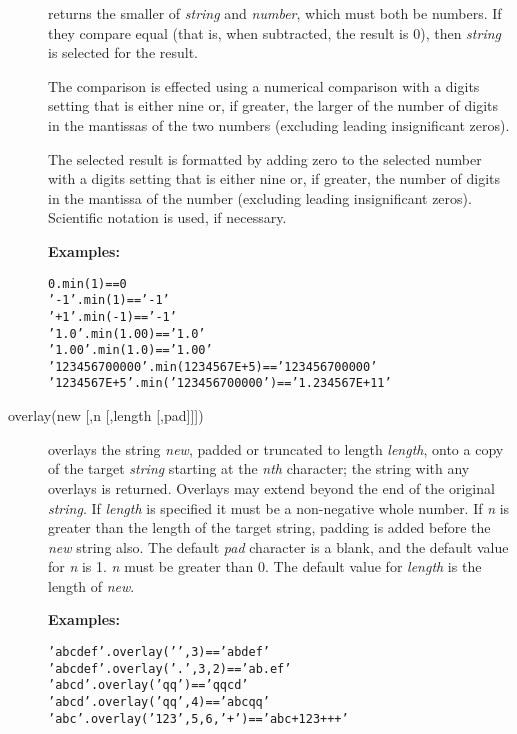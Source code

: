\begin{description}
returns the smaller of \emph{string} and \emph{number}, which
must both be numbers.  If they compare equal (that is, when subtracted,
the result is 0), then \emph{string} is selected for the result.
 
The comparison is effected using a numerical comparison with a digits
setting that is either nine or, if greater, the larger of the number of
digits in the mantissas of the two numbers (excluding leading
insignificant zeros).
 
The selected result is formatted by adding zero to the selected number
with a digits setting that is either nine or, if greater, the number of
digits in the mantissa of the number (excluding leading insignificant
zeros).
Scientific notation is used, if necessary.
 
\textbf{Examples:}
\begin{alltt}
0.min(1)          ==0
'-1'.min(1)       =='-1'
'+1'.min(-1)      =='-1'
'1.0'.min(1.00)   =='1.0'
'1.00'.min(1.0)   =='1.00'
'123456700000'.min(1234567E+5)   == '123456700000'
'1234567E+5'.min('123456700000') == '1.234567E+11'
\end{alltt}

\item[overlay(new [,n [,length [,pad{]]]})]\label{refoverlay}
overlays the string \emph{new}, padded or truncated to length
\emph{length}, onto a copy of the target \emph{string} starting
at the \emph{n}\emph{th} character; the string with any overlays is
returned.  Overlays may extend beyond the end of the original
\emph{string}.
If \emph{length} is specified it must be a non-negative whole
number.
If \emph{n} is greater than the length of
the target string, padding is added before the \emph{new} string
also.
The default \emph{pad} character is a blank, and the default value
for \emph{n} is 1.
\emph{n} must be greater than 0.
The default value for \emph{length} is the length of \emph{new}.
 
\textbf{Examples:}
\begin{alltt}
'abcdef'.overlay(' ',3)      == 'ab def'
'abcdef'.overlay('.',3,2)    == 'ab. ef'
'abcd'.overlay('qq')         == 'qqcd'
'abcd'.overlay('qq',4)       == 'abcqq'
'abc'.overlay('123',5,6,'+') == 'abc+123+++'
\end{alltt}


\end{description}
